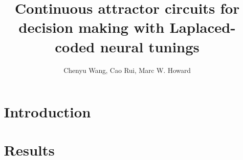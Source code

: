 \documentclass{article}
\title{Continuous attractor circuits for decision making with
Laplaced-coded neural tunings}
\author{Chenyu Wang, Cao Rui, Marc W. Howard}
\begin{document}
\maketitle










\section{Introduction}
\section{Results}
\end{document}
